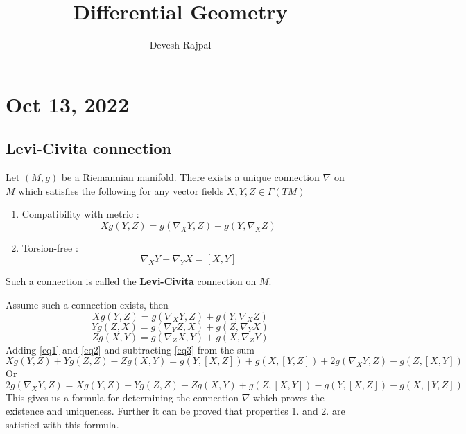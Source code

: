 \documentclass[12pt,a4paper]{article}
\title{\LARGE Differential Geometry}
\author{\large Devesh Rajpal}
\date{}
\theoremstyle{definition}
\renewenvironment{proof}[1][\proofname]{\vspace{-15pt}\begin{myproof}}{\end{myproof}}
\theoremstyle{greenbox}
\begin{document}
    \maketitle
    \tableofcontents
    \section{Oct 13, 2022}
    \subsection*{Levi-Civita connection}
    \bigskip
    \begin{thm}
        Let $ (M,g) $  be a Riemannian manifold. There exists a unique connection $ \nabla $ on $ M $ which satisfies the following for any vector fields $ X,Y,Z \in \Gamma(TM)$ 
        \begin{enumerate}
            \item Compatibility with metric : \[ Xg(Y,Z)  = g(\nabla_{X}Y, Z)+ g(Y, \nabla_{X}Z)\]
            \item Torsion-free : \[ \nabla_{X}Y - \nabla_{Y}X = [X,Y] \]
        \end{enumerate}
        Such a connection is called the \textbf{Levi-Civita} connection on $ M $.
    \end{thm}
    \begin{proof}
        Assume such a connection exists, then 
    \begin{equation}
        Xg(Y,Z) = g(\nabla_{X}Y,Z)+ g(Y,\nabla_{X}Z) \label{eq1}
    \end{equation}
    \begin{equation}
        Yg(Z,X) = g(\nabla_{Y}Z,X)+ g(Z,\nabla_{Y}X) \label{eq2}
    \end{equation}
    \begin{equation}
        Zg(X,Y) = g(\nabla_{Z}X,Y)+ g(X,\nabla_{Z}Y) \label{eq3}
    \end{equation}
    Adding \cref{eq1} and \cref{eq2} and subtracting \cref{eq3} from the sum 
    \[ Xg(Y,Z)+ Yg(Z,Z)- Zg(X,Y) = g(Y,[X,Z])+ g(X,[Y,Z]) + 2g(\nabla_{X}Y,Z) - g(Z,[X,Y])\]
    Or 
    \begin{equation}
        2g(\nabla_{X}Y,Z) = Xg(Y,Z)+ Yg(Z,Z)- Zg(X,Y) + g(Z,[X,Y]) - g(Y,[X,Z])- g(X,[Y,Z])
    \end{equation}
    This gives us a formula for determining the connection $ \nabla $ which proves the existence and uniqueness. Further it can be proved that properties 1. and 2. are satisfied with this formula.
    \end{proof}
\end{document}
